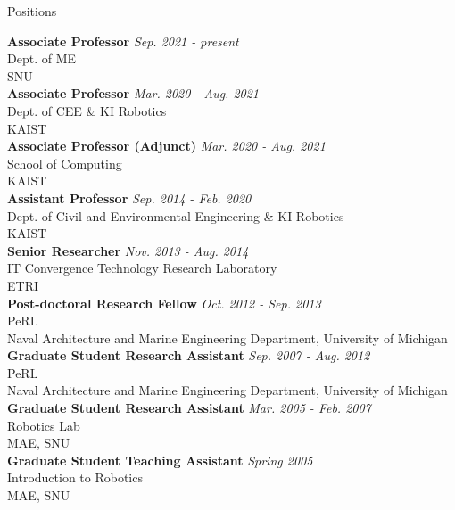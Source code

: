 \begin{rSection}{Positions}

{\bf Associate Professor} \hfill {\em Sep. 2021 - present} \\
Dept. of \ac{ME}\\
\acf{SNU}\\

{\bf Associate Professor} \hfill {\em Mar. 2020 - Aug. 2021} \\
Dept. of \ac{CEE} \& KI Robotics\\
\acf{KAIST}\\


{\bf Associate Professor (Adjunct)} \hfill {\em Mar. 2020 - Aug. 2021} \\
School of Computing\\
\acf{KAIST}\\

{\bf Assistant Professor} \hfill {\em Sep. 2014 - Feb. 2020} \\
Dept. of Civil and Environmental Engineering \& KI Robotics\\
\acf{KAIST}\\

{\bf Senior Researcher} \hfill {\em Nov. 2013 - Aug. 2014} \\
IT Convergence Technology Research Laboratory\\
\acf{ETRI}\\

{\bf Post-doctoral Research Fellow} \hfill {\em Oct. 2012 - Sep. 2013} \\
\acf{PeRL}\\
Naval Architecture and Marine Engineering Department, University of Michigan\\

{\bf Graduate Student Research Assistant} \hfill {\em Sep. 2007 - Aug. 2012} \\
\acf{PeRL}\\
Naval Architecture and Marine Engineering Department, University of Michigan\\

{\bf Graduate Student Research Assistant} \hfill {\em Mar. 2005 - Feb. 2007} \\
Robotics Lab\\
\acf{MAE}, \acf{SNU}\\

{\bf Graduate Student Teaching Assistant} \hfill {\em Spring 2005} \\
Introduction to Robotics\\
\acf{MAE}, \acf{SNU}\\

\end{rSection}
